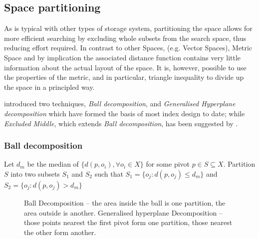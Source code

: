 \subsection{Space partitioning}
As is typical with other types of storage system, partitioning the space allows for more efficient searching by excluding whole subsets from the search space, thus reducing effort required.  In contrast to other Spaces, (e.g. Vector Spaces), Metric Space and by implication the associated distance function contains very little information about the actual layout of the space.  It is, however, possible to use the properties of the metric, and in particular, triangle inequality to divide up the space in a principled way.  

\cite{Uhlmann:1991} introduced two techniques, \textit{Ball decomposition}, and \textit{Generalised Hyperplane decomposition} which have formed the basis of most index design to date; while \textit{Excluded Middle}, which extends \textit{Ball decomposition}, has been suggested by \cite{Yianilos:1999}.
%  
\subsubsection{Ball decomposition}
%
\begin{mydef}
Let $d_m$ be the median of $\{d(p, o_i), \forall o_i \in X\}$ for some pivot $p \in S \subseteq X$.  Partition $S$ into two subsets $S_1$ and $S_2$ such that $S_1 = \{o_j : d(p, o_j) \leq d_m\}$ and $S_2 = \{o_j : d(p, o_j) > d_m\}$
\end{mydef}
%
\begin{figure}
\centering
{} \quad
{}
\caption[Ball Decomposition vs. Generalised hyperplane Decomposition]{Ball Decomposition -- the area inside the ball is one partition, the area outside is another.
Generalised hyperplane Decomposition -- those points nearest the first pivot form one partition, those nearest the other form another.}
\end{figure}
%
